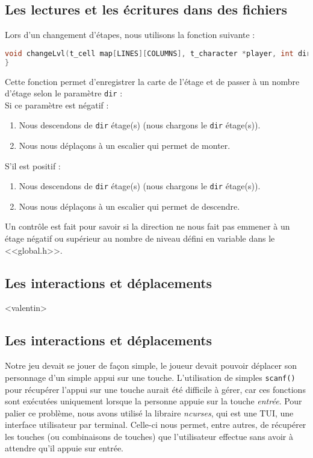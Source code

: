\documentclass[11pt]{report}
\begin{document}
		\subsection{Les lectures et les écritures dans des fichiers}
		
		Lors d'un changement d'étapes, nous utilisons la fonction suivante : \begin{lstlisting}[caption=changeLvl, language=C,style=Cstyle]
void changeLvl(t_cell map[LINES][COLUMNS], t_character *player, int dir){
}
		\end{lstlisting}
		Cette fonction permet d'enregistrer la carte de l'étage et de passer à un nombre d'étage selon le paramètre \texttt{dir} : \\
		Si ce paramètre est négatif : 
		\begin{enumerate}
			\item  Nous descendons de \texttt{dir} étage(s) (nous chargons le \texttt{dir} étage(s)).
			\item Nous nous déplaçons à un escalier qui permet de monter.
		\end{enumerate}
		S'il est positif : 
		\begin{enumerate}
			\item  Nous descendons de \texttt{dir} étage(s) (nous chargons le \texttt{dir} étage(s)).
			\item Nous nous déplaçons à un escalier qui permet de descendre.
		\end{enumerate}
		Un contrôle est fait pour savoir si la direction ne nous fait pas emmener à un étage négatif ou supérieur au nombre de niveau défini en variable dans le <<global.h>>.

		\subsection{Les interactions et déplacements}
		
		<valentin>

		\subsection{Les interactions et déplacements}\label{ncurses}

		
			Notre jeu devait se jouer de façon simple, le joueur devait pouvoir déplacer son personnage d'un simple appui sur une touche. L'utilisation de simples \texttt{scanf()} pour récupérer l'appui sur une touche aurait été difficile à gérer, car ces fonctions sont exécutées uniquement lorsque la personne appuie sur la touche \textit{entrée}. Pour palier ce problème, nous avons utilisé la libraire \emph{ncurses}, qui est une \textsc{TUI}, une interface utilisateur par terminal. Celle-ci nous permet, entre autres, de récupérer les touches (ou combinaisons de touches) que l'utilisateur effectue sans avoir à attendre qu'il appuie sur entrée.
			
\end{document}
